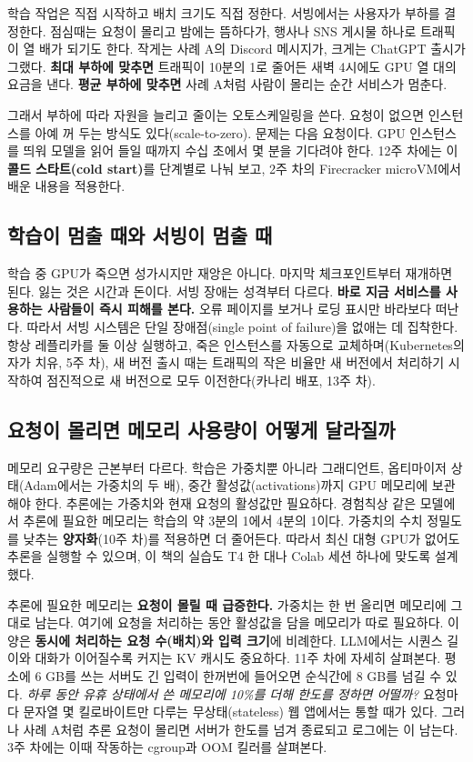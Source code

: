 학습 작업은 직접 시작하고 배치 크기도 직접 정한다. 서빙에서는 사용자가 부하를 결정한다. 점심때는 요청이 몰리고 밤에는 뜸하다가, 행사나 SNS 게시물 하나로 트래픽이 열 배가 되기도 한다. 작게는 사례 A의 Discord 메시지가, 크게는 ChatGPT 출시가 그랬다. \textbf{최대 부하에 맞추면} 트래픽이 10분의 1로 줄어든 새벽 4시에도 GPU 열 대의 요금을 낸다. \textbf{평균 부하에 맞추면} 사례 A처럼 사람이 몰리는 순간 서비스가 멈춘다.

그래서 부하에 따라 자원을 늘리고 줄이는 오토스케일링을 쓴다. 요청이 없으면 인스턴스를 아예 꺼 두는 방식도 있다(scale-to-zero). 문제는 다음 요청이다. GPU 인스턴스를 띄워 모델을 읽어 들일 때까지 수십 초에서 몇 분을 기다려야 한다. 12주 차에는 이 \textbf{콜드 스타트(cold start)}를 단계별로 나눠 보고, 2주 차의 Firecracker microVM에서 배운 내용을 적용한다.

\subsection*{학습이 멈출 때와 서빙이 멈출 때}

학습 중 GPU가 죽으면 성가시지만 재앙은 아니다. 마지막 체크포인트부터 재개하면 된다. 잃는 것은 시간과 돈이다. 서빙 장애는 성격부터 다르다. \textbf{바로 지금 서비스를 사용하는 사람들이 즉시 피해를 본다.} 오류 페이지를 보거나 로딩 표시만 바라보다 떠난다. 따라서 서빙 시스템은 단일 장애점(single point of failure)을 없애는 데 집착한다. 항상 레플리카를 둘 이상 실행하고, 죽은 인스턴스를 자동으로 교체하며(Kubernetes의 자가 치유, 5주 차), 새 버전 출시 때는 트래픽의 작은 비율만 새 버전에서 처리하기 시작하여 점진적으로 새 버전으로 모두 이전한다(카나리 배포, 13주 차).

\subsection*{요청이 몰리면 메모리 사용량이 어떻게 달라질까}

메모리 요구량은 근본부터 다르다. 학습은 가중치뿐 아니라 그래디언트, 옵티마이저 상태(Adam에서는 가중치의 두 배), 중간 활성값(activations)까지 GPU 메모리에 보관해야 한다. 추론에는 가중치와 현재 요청의 활성값만 필요하다. 경험칙상 같은 모델에서 추론에 필요한 메모리는 학습의 약 3분의 1에서 4분의 1이다. 가중치의 수치 정밀도를 낮추는 \textbf{양자화}(10주 차)를 적용하면 더 줄어든다. 따라서 최신 대형 GPU가 없어도 추론을 실행할 수 있으며, 이 책의 실습도 T4 한 대나 Colab 세션 하나에 맞도록 설계했다.

추론에 필요한 메모리는 \textbf{요청이 몰릴 때 급증한다.} 가중치는 한 번 올리면 메모리에 그대로 남는다. 여기에 요청을 처리하는 동안 활성값을 담을 메모리가 따로 필요하다. 이 양은 \textbf{동시에 처리하는 요청 수(배치)와 입력 크기}에 비례한다. LLM에서는 시퀀스 길이와 대화가 이어질수록 커지는 KV 캐시도 중요하다. 11주 차에 자세히 살펴본다. 평소에 6 GB를 쓰는 서버도 긴 입력이 한꺼번에 들어오면 순식간에 8 GB를 넘길 수 있다. \textit{하루 동안 유휴 상태에서 쓴 메모리에 10\%를 더해 한도를 정하면 어떨까?} 요청마다 문자열 몇 킬로바이트만 다루는 무상태(stateless) 웹 앱에서는 통할 때가 있다. 그러나 사례 A처럼 추론 요청이 몰리면 서버가 한도를 넘겨 종료되고 로그에는 이 남는다. 3주 차에는 이때 작동하는 cgroup과 OOM 킬러를 살펴본다.

